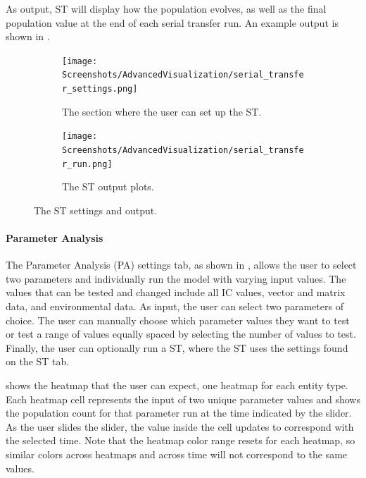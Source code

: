 As output, ST will display how the population evolves, as well as the final population value at the end of each serial transfer run. 
An example output is shown in .

\begin{figure}[h!]
    \centering
    \begin{subfigure}{0.49\linewidth}
        \centering
        \captionsetup{width=1\linewidth}
        \texttt{[image: Screenshots/AdvancedVisualization/serial\_transfer\_settings.png]}
        \caption{
            The section where the user can set up the ST.
        }
        \label{fig:ss:av:serial_transfer_settings}
    \end{subfigure}
    \hfill
    \begin{subfigure}{0.49\linewidth}
        \centering
        \captionsetup{width=1\linewidth}
        \texttt{[image: Screenshots/AdvancedVisualization/serial\_transfer\_run.png]}
        \caption{
            The ST output plots. 
        }
        \label{fig:ss:av:serial_transfer_run}
    \end{subfigure}
    \caption{The ST settings and output.}
\end{figure}

\paragraph{Parameter Analysis}
\label{sec:parameter_analysis}
The Parameter Analysis (PA) settings tab, as shown in , allows the user to select two parameters and individually run the model with varying input values.
The values that can be tested and changed include all IC values, vector and matrix data, and environmental data.
As input, the user can select two parameters of choice.
The user can manually choose which parameter values they want to test or test a range of values equally spaced by selecting the number of values to test.
Finally, the user can optionally run a ST, where the ST uses the settings found on the ST tab. 

 shows the heatmap that the user can expect, one heatmap for each entity type.
Each heatmap cell represents the input of two unique parameter values and shows the population count for that parameter run at the time indicated by the slider. 
As the user slides the slider, the value inside the cell updates to correspond with the selected time. 
Note that the heatmap color range resets for each heatmap, so similar colors across heatmaps and across time will not correspond to the same values.

